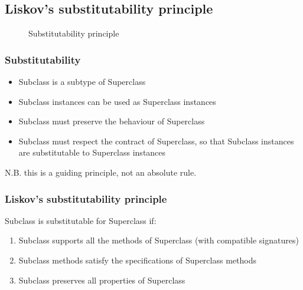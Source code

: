 \FloatBarrier

\subsection{Liskov’s substitutability principle}

\begin{figure}[!ht]
    \centering
    
    \caption{Substitutability principle}
\end{figure}

\subsubsection{Substitutability}

\begin{itemize}
    \item Subclass is a subtype of Superclass
    \item Subclass instances can be used as Superclass instances
    \item Subclass must preserve the behaviour of Superclass
    \item Subclass must respect the contract of Superclass, so that Subclass instances are substitutable to Superclass instances
\end{itemize}

N.B. this is a guiding principle, not an absolute rule. \newline

\subsubsection{Liskov’s substitutability principle}

Subclass is substitutable for Superclass if:

\begin{enumerate}
    \item Subclass supports all the methods of Superclass (with compatible signatures)
    \item Subclass methods satisfy the specifications of Superclass methods
    \item Subclass preserves all properties of Superclass
\end{enumerate}

